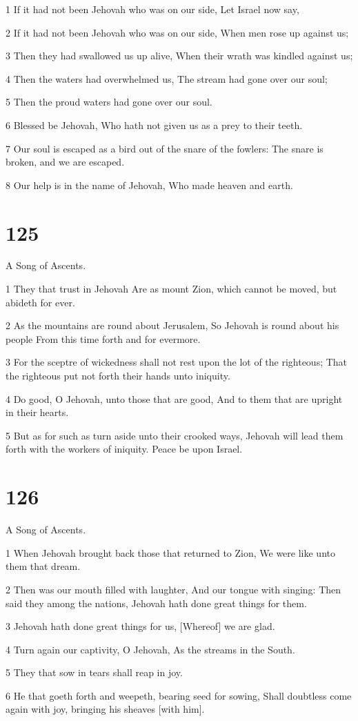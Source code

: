 \par 1 If it had not been Jehovah who was on our side, Let Israel now say,
\par 2 If it had not been Jehovah who was on our side, When men rose up against us;
\par 3 Then they had swallowed us up alive, When their wrath was kindled against us;
\par 4 Then the waters had overwhelmed us, The stream had gone over our soul;
\par 5 Then the proud waters had gone over our soul.
\par 6 Blessed be Jehovah, Who hath not given us as a prey to their teeth.
\par 7 Our soul is escaped as a bird out of the snare of the fowlers: The snare is broken, and we are escaped.
\par 8 Our help is in the name of Jehovah, Who made heaven and earth.

\chapter{125}

\par A Song of Ascents.

\par 1 They that trust in Jehovah Are as mount Zion, which cannot be moved, but abideth for ever.
\par 2 As the mountains are round about Jerusalem, So Jehovah is round about his people From this time forth and for evermore.
\par 3 For the sceptre of wickedness shall not rest upon the lot of the righteous; That the righteous put not forth their hands unto iniquity.
\par 4 Do good, O Jehovah, unto those that are good, And to them that are upright in their hearts.
\par 5 But as for such as turn aside unto their crooked ways, Jehovah will lead them forth with the workers of iniquity. Peace be upon Israel.

\chapter{126}

\par A Song of Ascents.

\par 1 When Jehovah brought back those that returned to Zion, We were like unto them that dream.
\par 2 Then was our mouth filled with laughter, And our tongue with singing: Then said they among the nations, Jehovah hath done great things for them.
\par 3 Jehovah hath done great things for us, [Whereof] we are glad.
\par 4 Turn again our captivity, O Jehovah, As the streams in the South.
\par 5 They that sow in tears shall reap in joy.
\par 6 He that goeth forth and weepeth, bearing seed for sowing, Shall doubtless come again with joy, bringing his sheaves [with him].

